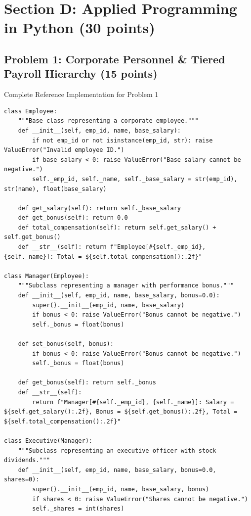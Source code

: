 \documentclass[11pt,a4paper]{article}
\begin{document}
\newpage
\section*{Section D: Applied Programming in Python (30 points)}

\subsection*{Problem 1: Corporate Personnel \& Tiered Payroll Hierarchy (15 points)}

\begin{solbox}{Complete Reference Implementation for Problem 1}
\begin{lstlisting}
class Employee:
    """Base class representing a corporate employee."""
    def __init__(self, emp_id, name, base_salary):
        if not emp_id or not isinstance(emp_id, str): raise ValueError("Invalid employee ID.")
        if base_salary < 0: raise ValueError("Base salary cannot be negative.")
        self._emp_id, self._name, self._base_salary = str(emp_id), str(name), float(base_salary)

    def get_salary(self): return self._base_salary
    def get_bonus(self): return 0.0
    def total_compensation(self): return self.get_salary() + self.get_bonus()
    def __str__(self): return f"Employee[#{self._emp_id}, {self._name}]: Total = ${self.total_compensation():.2f}"

class Manager(Employee):
    """Subclass representing a manager with performance bonus."""
    def __init__(self, emp_id, name, base_salary, bonus=0.0):
        super().__init__(emp_id, name, base_salary)
        if bonus < 0: raise ValueError("Bonus cannot be negative.")
        self._bonus = float(bonus)

    def set_bonus(self, bonus):
        if bonus < 0: raise ValueError("Bonus cannot be negative.")
        self._bonus = float(bonus)

    def get_bonus(self): return self._bonus
    def __str__(self):
        return f"Manager[#{self._emp_id}, {self._name}]: Salary = ${self.get_salary():.2f}, Bonus = ${self.get_bonus():.2f}, Total = ${self.total_compensation():.2f}"

class Executive(Manager):
    """Subclass representing an executive officer with stock dividends."""
    def __init__(self, emp_id, name, base_salary, bonus=0.0, shares=0):
        super().__init__(emp_id, name, base_salary, bonus)
        if shares < 0: raise ValueError("Shares cannot be negative.")
        self._shares = int(shares)


\end{lstlisting}
\end{solbox}
\end{document}
